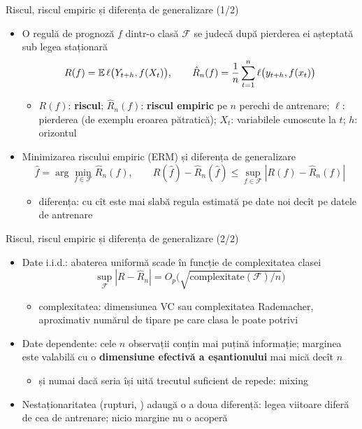 \begin{frame}{Riscul, riscul empiric și diferența de generalizare (1/2)}
\itemsize{\small}
\begin{itemize}
    \item O regulă de prognoză $f$ dintr-o clasă $\mathcal F$ se judecă după pierderea ei așteptată sub legea staționară
    \[ R(f) = \mathbb{E}\,\ell\big(Y_{t+h}, f(X_t)\big), \qquad \hat R_n(f) = \frac1n\sum_{t=1}^n \ell\big(y_{t+h}, f(x_t)\big) \]
    \begin{itemize}
        \item $R(f)$: \textbf{riscul}; $\hat R_n(f)$: \textbf{riscul empiric} pe $n$ perechi de antrenare; $\ell$: pierderea (de exemplu eroarea pătratică); $X_t$: variabilele cunoscute la $t$; $h$: orizontul
    \end{itemize}
    \item Minimizarea riscului empiric (ERM) și diferența de generalizare
    \[ \hat f = \arg\min_{f \in \mathcal F}\hat R_n(f), \qquad R(\hat f) - \hat R_n(\hat f) \le \sup_{f \in \mathcal F}|R(f) - \hat R_n(f)| \]
    \begin{itemize}
        \item diferența: cu cît este mai slabă regula estimată pe date noi decît pe datele de antrenare
    \end{itemize}
\end{itemize}
\end{frame}

\begin{frame}{Riscul, riscul empiric și diferența de generalizare (2/2)}
\itemsize{\small}
\begin{itemize}
    \item Date i.i.d.: abaterea uniformă scade în funcție de complexitatea clasei
    \[ \sup_{\mathcal F}|R - \hat R_n| = O_p\Big(\sqrt{\mathrm{complexitate}(\mathcal F)/n}\Big) \]
    \begin{itemize}
        \item complexitatea: dimensiunea VC sau complexitatea Rademacher, aproximativ numărul de tipare pe care clasa le poate potrivi
    \end{itemize}
    \item Date dependente: cele $n$ observații conțin mai puțină informație; marginea este valabilă cu o \textbf{dimensiune efectivă a eșantionului} mai mică decît $n$
    \begin{itemize}
        \item și numai dacă seria își uită trecutul suficient de repede: mixing
    \end{itemize}
    \item Nestaționaritatea (rupturi, ) adaugă o a doua diferență: legea viitoare diferă de cea de antrenare; nicio margine nu o acoperă
\end{itemize}
\end{frame}

